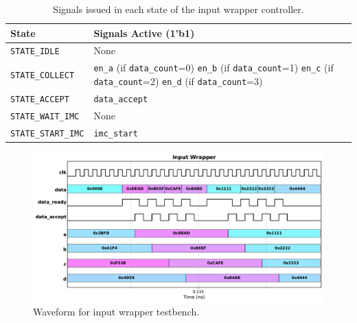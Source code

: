 \documentclass[../main.tex]{subfiles}
\begin{document}
\begin{table}[h]
    \centering
    \renewcommand{\arraystretch}{1.5}
    \setlength{\tabcolsep}{6pt}

    \begin{tabularx}{\textwidth}{@{}l X@{}}
        \toprule
        \textbf{State} & \textbf{Signals Active (1'b1)} \\
        \midrule
        \texttt{STATE\_IDLE} & 
            None \\ 
        \hline
        \texttt{STATE\_COLLECT} & 
            \texttt{en\_a} (if \texttt{data\_count}=0) \newline
            \texttt{en\_b} (if \texttt{data\_count}=1) \newline
            \texttt{en\_c} (if \texttt{data\_count}=2) \newline
            \texttt{en\_d} (if \texttt{data\_count}=3) \\
        \hline
        \texttt{STATE\_ACCEPT} & 
            \texttt{data\_accept} \\
        \hline
        \texttt{STATE\_WAIT\_IMC} & 
            None \\
        \hline
        \texttt{STATE\_START\_IMC} & 
            \texttt{imc\_start} \\
        \bottomrule
    \end{tabularx}

    \caption{Signals issued in each state of the input wrapper controller.}
    \label{tab:in_wrapper_state_signals}
\end{table}

\begin{figure}[h]
    \centering
    \includegraphics[width=\linewidth]{assets/q2_in_wrapper_wave.pdf}
    \caption{Waveform for input wrapper testbench.}
    \label{fig:q2_in_wrapper_wave}
\end{figure}
\end{document}
